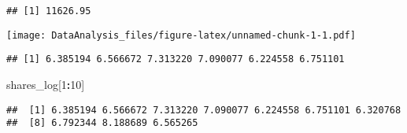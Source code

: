 \documentclass[]{article}
\newenvironment{Shaded}{\begin{snugshade}}{\end{snugshade}}
\newcommand{\KeywordTok}[1]{\textcolor[rgb]{0.13,0.29,0.53}{\textbf{#1}}}
\newcommand{\DataTypeTok}[1]{\textcolor[rgb]{0.13,0.29,0.53}{#1}}
\newcommand{\DecValTok}[1]{\textcolor[rgb]{0.00,0.00,0.81}{#1}}
\newcommand{\StringTok}[1]{\textcolor[rgb]{0.31,0.60,0.02}{#1}}
\newcommand{\CommentTok}[1]{\textcolor[rgb]{0.56,0.35,0.01}{\textit{#1}}}
\newcommand{\OtherTok}[1]{\textcolor[rgb]{0.56,0.35,0.01}{#1}}
\newcommand{\OperatorTok}[1]{\textcolor[rgb]{0.81,0.36,0.00}{\textbf{#1}}}
\newcommand{\NormalTok}[1]{#1}
\begin{document}
\begin{Shaded}
\end{Shaded}

\begin{verbatim}
## [1] 11626.95
\end{verbatim}

\begin{Shaded}
\end{Shaded}

\texttt{[image: DataAnalysis\_files/figure-latex/unnamed-chunk-1-1.pdf]}

\begin{Shaded}
\end{Shaded}

\begin{verbatim}
## [1] 6.385194 6.566672 7.313220 7.090077 6.224558 6.751101
\end{verbatim}

\begin{Shaded}
\begin{Highlighting}[]
\NormalTok{shares_log[}\DecValTok{1}\OperatorTok{:}\DecValTok{10}\NormalTok{]}
\end{Highlighting}
\end{Shaded}

\begin{verbatim}
##  [1] 6.385194 6.566672 7.313220 7.090077 6.224558 6.751101 6.320768
##  [8] 6.792344 8.188689 6.565265
\end{verbatim}
\end{document}
